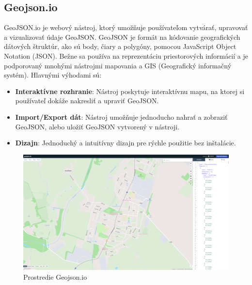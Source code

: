 \subsection{Geojson.io}
GeoJSON.io je webový nástroj, ktorý umožňuje používateľom vytvárať, upravovať a vizualizovať údaje GeoJSON. GeoJSON je formát na kódovanie geografických dátových štruktúr, ako sú body, čiary a polygóny, pomocou JavaScript Object Notation (JSON). Bežne sa používa na reprezentáciu priestorových informácií a je podporovaný mnohými nástrojmi mapovania a GIS (Geografický informačný systém). Hlavnými výhodami sú:
\begin{itemize}
    \item \textbf{Interaktívne rozhranie}: Nástroj poskytuje interaktívnu mapu, na ktorej si používateľ dokáže nakresliť a upraviť GeoJSON.
    \item \textbf{Import/Export dát}: Nástroj umožňuje jednoducho nahrať a zobraziť GeoJSON, alebo uložiť GeoJSON vytvorený v nástroji.
    \item \textbf{Dizajn}: Jednoduchý a intuitívny dizajn pre rýchle použitie bez inštalácie.
\end{itemize}
\begin{figure}[H]
    \centering
    \includegraphics[width = \linewidth]{img/geojson.png}
    \caption{Prostredie Geojson.io}
\end{figure}
